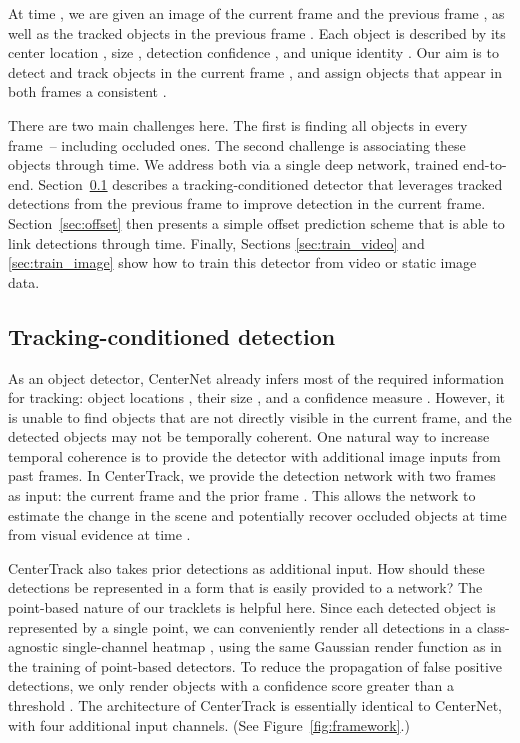 \documentclass[runningheads]{llncs}
\newcommand{\lblsec}[1]{\label{sec:#1}}
\newcommand{\refsec}[1]{Section~\ref{sec:#1}}
\newcommand{\reffig}[1]{Figure~\ref{fig:#1}}
\begin{document}
At time , we are given an image of the current frame  and the previous frame , as well as the tracked objects in the previous frame .
Each object  is described by its center location , size , detection confidence , and unique identity .
Our aim is to detect and track objects  in the current frame , and assign objects that appear in both frames a consistent .

There are two main challenges here.
The first is finding all objects in every frame~-- including occluded ones.
The second challenge is associating these objects through time.
We address both via a single deep network, trained end-to-end.
\refsec{cond_track} describes a tracking-conditioned detector that leverages tracked detections from the previous frame to improve detection in the current frame.
\refsec{offset} then presents a simple offset prediction scheme that is able to link detections through time.
Finally, Sections \ref{sec:train_video} and \ref{sec:train_image} show how to train this detector from video or static image data.

\subsection{Tracking-conditioned detection}
\lblsec{cond_track}

As an object detector, CenterNet already infers most of the required information for tracking: object locations , their size , and a confidence measure .
However, it is unable to find objects that are not directly visible in the current frame, and the detected objects may not be temporally coherent.
One natural way to increase temporal coherence is to provide the detector with additional image inputs from past frames.
In CenterTrack, we provide the detection network with two frames as input: the current frame  and the prior frame .
This allows the network to estimate the change in the scene and potentially recover occluded objects at time  from visual evidence at time .

CenterTrack also takes prior detections  as additional input.
How should these detections be represented in a form that is easily provided to a network?
The point-based nature of our tracklets is helpful here.
Since each detected object is represented by a single point, we can conveniently render all detections in a class-agnostic single-channel heatmap , using the same Gaussian render function as in the training of point-based detectors.
To reduce the propagation of false positive detections, we only render objects with a confidence score greater than a threshold .
The architecture of CenterTrack is essentially identical to CenterNet, with four additional input channels. (See \reffig{framework}.)
\end{document}
